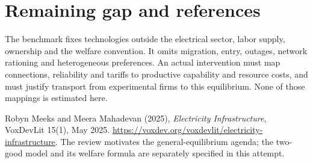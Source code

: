 \documentclass[11pt,a4paper]{article}
\theoremstyle{definition}
\theoremstyle{remark}
\begin{document}
\section{Remaining gap and references}
The benchmark fixes technologies outside the electrical sector, labor supply, ownership and the welfare convention. It omits migration, entry, outages, network rationing and heterogeneous preferences. An actual intervention must map connections, reliability and tariffs to productive capability and resource costs, and must justify transport from experimental firms to this equilibrium. None of those mappings is estimated here.

Robyn Meeks and Meera Mahadevan (2025), \emph{Electricity Infrastructure}, VoxDevLit 15(1), May 2025. \url{https://voxdev.org/voxdevlit/electricity-infrastructure}. The review motivates the general-equilibrium agenda; the two-good model and its welfare formula are separately specified in this attempt.
\end{document}
